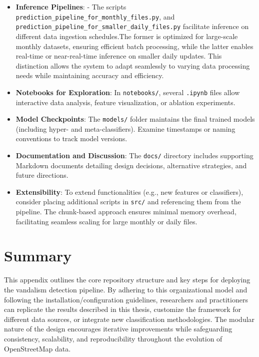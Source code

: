 \documentclass[
    13pt, %
    a4paper, %
    listof=totoc, %
    bibliography=totoc, %
    index=totoc, %
    headsepline
]{scrreprt}
\begin{document}
\begin{itemize}
    \item \textbf{Inference Pipelines}: 
    - The scripts \newline \texttt{prediction\_pipeline\_for\_monthly\_files.py}, and \newline \texttt{prediction\_pipeline\_for\_smaller\_daily\_files.py} facilitate inference on different data ingestion schedules.The former is optimized for large-scale monthly datasets, ensuring efficient batch processing, while the latter enables real-time or near-real-time inference on smaller daily updates. This distinction allows the system to adapt seamlessly to varying data processing needs while maintaining accuracy and efficiency.

    \item \textbf{Notebooks for Exploration}: 
    In \texttt{notebooks/}, several \texttt{.ipynb} files allow interactive data analysis, feature visualization, or ablation experiments. 

    \item \textbf{Model Checkpoints}: 
    The \texttt{models/} folder maintains the final trained models (including hyper- and meta-classifiers). Examine timestamps or naming conventions to track model versions.

    \item \textbf{Documentation and Discussion}: 
    The \texttt{docs/} directory includes supporting Markdown documents detailing design decisions, alternative strategies, and future directions.

    \item \textbf{Extensibility}: 
    To extend functionalities (e.g., new features or classifiers), consider placing additional scripts in \texttt{src/} and referencing them from the pipeline. The chunk-based approach ensures minimal memory overhead, facilitating seamless scaling for large monthly or daily files.
\end{itemize}

\section{Summary}
\label{sec:appendix_summary}

This appendix outlines the core repository structure and key steps for deploying the vandalism detection pipeline. By adhering to this organizational model and following the installation/configuration guidelines, researchers and practitioners can replicate the results described in this thesis, customize the framework for different data sources, or integrate new classification methodologies. The modular nature of the design encourages iterative improvements while safeguarding consistency, scalability, and reproducibility throughout the evolution of OpenStreetMap data. 
\end{document}

